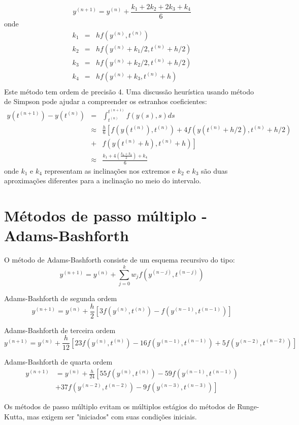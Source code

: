 $$y^{(n+1)}=y^{(n)}+\frac{k_1+2k_2+2k_3+k_4}{6}$$
onde
\begin{eqnarray*}
k_1&=&hf(y^{(n)},t^{(n)})\\
k_2&=&hf(y^{(n)}+k_1/2,t^{(n)}+h/2)\\
k_3&=&hf(y^{(n)}+k_2/2,t^{(n)}+h/2)\\
k_4&=&hf(y^{(n)}+k_3,t^{(n)}+h)\\
\end{eqnarray*}
Este método tem ordem de precisão 4. Uma discussão heurística usando método de Simpson pode ajudar a compreender os estranhos coeficientes:
\begin{eqnarray*}
y({t^{(n+1)}})-y({t^{(n)}})&=&\int_{t^{(n)}}^{t^{(n+1)}}f(y(s),s)ds \\
&\approx& \frac{h}{6}\left[ f\left(y(t^{(n)}),t^{(n)}\right)+4f\left(y(t^{(n)}+h/2),t^{(n)}+h/2\right)\right.\\
&+&\left.f\left(y(t^{(n)}+h),t^{(n)}+h\right)\right]\\
&\approx& \frac{k_1+4(\frac{k_2+k_3}{2})+k_4}{6}
\end{eqnarray*}
onde $k_1$ e $k_4$ representam as inclinações nos extremos e $k_2$ e $k_3$ são duas aproximações diferentes para a inclinação no meio do intervalo.


\section{Métodos de passo múltiplo - Adams-Bashforth}

O método de Adams-Bashforth consiste de um esquema recursivo do tipo:
$$y^{(n+1)}=y^{(n)}+\sum_{j=0}^k w_jf(y^{(n-j)},t^{(n-j)})$$

\begin{ex} Adams-Bashforth de segunda ordem
$$y^{(n+1)}=y^{(n)}+\frac{h}{2}\left[3f\left(y^{(n)},t^{(n)}\right)-f\left(y^{(n-1)},t^{(n-1)}\right)\right]$$
\end{ex}
\begin{ex} Adams-Bashforth de terceira ordem
$$y^{(n+1)}=y^{(n)}+\frac{h}{12}\left[23f\left(y^{(n)},t^{(n)}\right)-16f\left(y^{(n-1)},t^{(n-1)}\right)+5f\left(y^{(n-2)},t^{(n-2)}\right)\right]$$
\end{ex}
\begin{ex} Adams-Bashforth de quarta ordem
  \begin{equation*}
    \begin{split}
      y^{(n+1)} &= y^{(n)} + \frac{h}{24}\left[55f\left(y^{(n)},t^{(n)}\right)-59f\left(y^{(n-1)},t^{(n-1)}\right)\right.\\
        &+\left. 37f\left(y^{(n-2)},t^{(n-2)}\right)-9f\left(y^{(n-3)},t^{(n-3)}\right)\right]    
    \end{split}
  \end{equation*}
\end{ex}
Os métodos de passo múltiplo evitam os múltiplos estágios do métodos de Runge-Kutta, mas exigem ser "iniciados" com suas condições iniciais.

